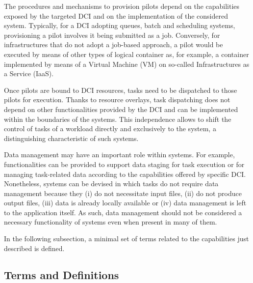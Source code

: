 \documentclass{sig-alternate}
\begin{document}
The procedures and mechanisms to provision pilots depend on the
capabilities exposed by the targeted DCI and on the implementation of
the considered \pilot system. Typically, for a DCI adopting queues,
batch and scheduling systems, provisioning a pilot involves it being
submitted as a job. Conversely, for infrastructures that do not adopt a
job-based approach, a pilot would be executed by means of other types of
logical container as, for example, a container implemented by means of a
Virtual Machine (VM) on so-called Infrastructures as a Service (IaaS).


Once pilots are bound to DCI resources, tasks need to be dispatched to those
pilots for execution.
Thanks to resource overlays, task dispatching does not
depend on other functionalities provided by the DCI and can be implemented
within the boundaries of the \pilot systems. This independence allows to shift
the control of tasks of a workload directly and exclusively to the \pilot
system, a distinguishing characteristic of such systems.

Data management may have an important role within \pilot systems. For example,
functionalities can be provided to support data staging for task execution or
for managing task-related data according to the capabilities offered by
specific DCI. Nonetheless, \pilot systems can be devised in which tasks do not
require data management because they (i) do not necessitate input files, (ii)
do not produce output files, (iii) data is already locally available or (iv)
data management is left to the application itself. As such, data management
should not be considered a necessary functionality of \pilot systems even when
present in many of them.

In the following subsection, a minimal set of terms related to the
capabilities just described is defined.

\subsection{Terms and Definitions}
\label{subsec:vocab_terms_and_definitions}
\end{document}
